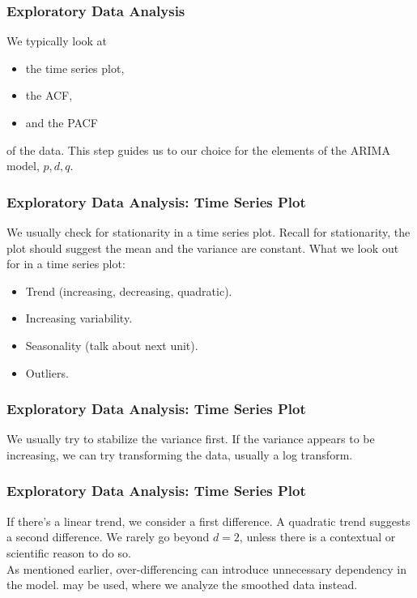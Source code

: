 \documentclass[%
xcolor=pdftex]{beamer}
\begin{document}


\begin{frame}
\frametitle{Exploratory Data Analysis}

We typically look at

\begin{itemize}
\item the time series plot,
\item the ACF,
\item and the PACF
\end{itemize}

of the data. This step guides us to our choice for the elements of the ARIMA model, $p,d,q$.

\end{frame}

\begin{frame}
\frametitle{Exploratory Data Analysis: Time Series Plot}

We usually check for stationarity in a time series plot. Recall for stationarity, the plot should suggest the mean and the variance are constant. What we look out for in a time series plot:

\begin{itemize}
\item Trend (increasing, decreasing, quadratic).
\item Increasing variability.
\item Seasonality (talk about next unit).
\item Outliers.
\end{itemize}


\end{frame}

\begin{frame}
\frametitle{Exploratory Data Analysis: Time Series Plot}


We usually try to stabilize the variance first. If the variance appears to be increasing, we can try transforming the data, usually a log transform.

\end{frame}

\begin{frame}
\frametitle{Exploratory Data Analysis: Time Series Plot}

If there's a linear trend, we consider a first difference. A quadratic trend suggests a second difference. We rarely go beyond $d=2$, unless there is a contextual or scientific reason to do so. \\
\vspace{5mm}
As mentioned earlier, over-differencing can introduce unnecessary dependency in the model. \underline{\hspace{35 mm}} may be used, where we analyze the smoothed data instead.

\end{frame}
\end{document}
